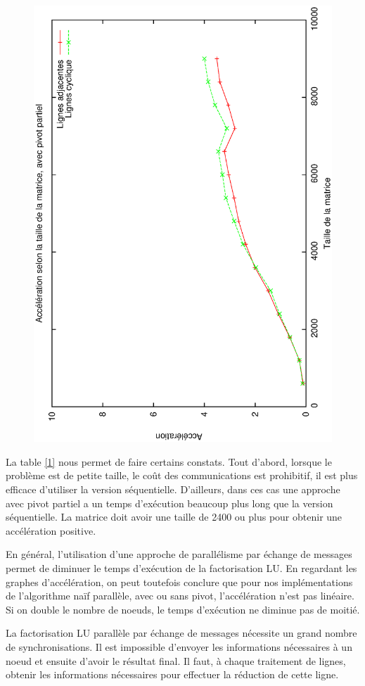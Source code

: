 \documentclass[12pt,letterpaper]{article} %
\begin{document}
\begin{figure}[h!]
\begin{center}
\includegraphics[angle=-90, width=0.65\linewidth]{taille_pivot.eps}
\end{center}
\end{figure}


La table \ref{1} nous permet de faire certains constats. Tout d'abord, lorsque le
problème est de petite taille, le coût des communications est prohibitif, il est
plus efficace d'utiliser la version séquentielle. D'ailleurs, dans ces cas une
approche avec pivot partiel a un temps d'exécution beaucoup plus long que la version
séquentielle. La matrice doit avoir une taille de 2400 ou plus pour obtenir une
accélération positive.

En général, l'utilisation d'une approche de parallélisme par échange de messages
permet de diminuer le temps d'exécution de la factorisation LU. En regardant les
graphes d'accélération, on peut toutefois conclure que pour nos implémentations
de l'algorithme naïf parallèle, avec ou sans pivot, l'accélération n'est pas linéaire.
Si on double le nombre de noeuds, le temps d'exécution ne diminue pas de moitié.

La factorisation LU parallèle par échange de messages nécessite un grand nombre de synchronisations.
Il est impossible d'envoyer les informations nécessaires à un noeud et ensuite d'avoir le résultat
final. Il faut, à chaque traitement de lignes, obtenir les informations nécessaires pour effectuer
la réduction de cette ligne.
\end{document}
